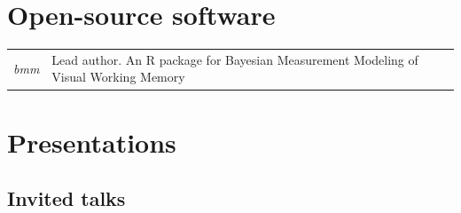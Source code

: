 \documentclass[letterpaper]{article}
\begin{document}
\section*{Open-source software}
\begin{longtable}{p{0.7cm}p{15cm}}
  {\it bmm} & Lead author. An R package for Bayesian Measurement Modeling of Visual Working Memory \\
\end{longtable}

\section*{Presentations}
\subsection*{Invited talks}
\end{document}
